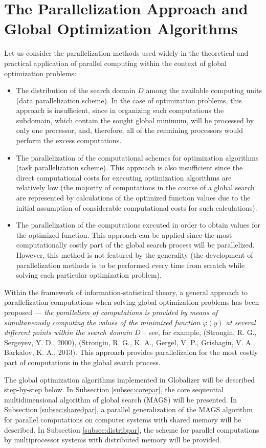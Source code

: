 \documentclass{gOMS2e}
\theoremstyle{plain}%
\theoremstyle{definition}
\theoremstyle{remark}
\begin{document}
\section{The Parallelization Approach and Global Optimization Algorithms}
\label{sec:parallel}
Let us consider the parallelization methods used widely in the theoretical and
practical application of parallel computing within the context of global optimization problems:
\begin{itemize}
  \item The distribution of the search domain \(D\) among the available computing units
  (data parallelization scheme). In the case of optimization problems, this approach is
  insufficient, since in organizing such computations the subdomain, which contain the
  sought global minimum, will be processed by only one processor, and, therefore,
  all of the remaining processors would perform the excess computations.
  \item The parallelization of the computational schemes for optimization algorithms
  (task parallelization scheme). This approach is also insufficient since the direct
  computational costs for executing optimization algorithms are relatively low
  (the majority of computations in the course of a global search are represented by
  calculations of the optimized function values due to the initial assumption of
  considerable computational costs for such calculations).
  \item The parallelization of the computations executed in order to obtain values
  for the optimized function. This approach can be applied since the most computationally
  costly part of the global search process will be parallelized. However, this method is not
  featured by the generality (the development of parallelization methods is to be performed
  every time from scratch while solving each particular optimization problem).
\end{itemize}
\par
Within the framework of information-statistical theory, a general approach to
parallelization computations when solving global optimization problems has been
proposed --- \textit{the parallelism of computations is provided by means of simultaneously
computing the values of the minimized function \(\varphi(y)\) at several different
points within the search domain \(D\)} – see, for example, (Strongin, R. G., Sergeyev, Y. D., 2000), (Strongin, R. G., K. A., Gergel, V. P., Grishagin, V. A., Barkalov, K. A.,  2013).
This approach provides parallelizaion for the most costly part of computations in the global search process.
\par
The global optimization algorithms implemented in Globalizer will be described step-by-step below.
In Subsection \ref{subsec:corepar}, the core sequential multidimensional algorithm of global search (MAGS) will be presented.
In Subsection \ref{subsec:sharedpar}, a parallel generalization of the MAGS algorithm for parallel computations on
computer systems with shared memory will be described. In Subsection \ref{subsec:distribpar}, the scheme
for parallel computations by multiprocessor systems with distributed memory will be provided.
\end{document}
